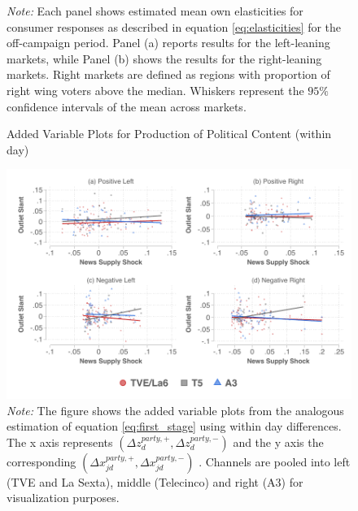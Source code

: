 \documentclass[12pt]{article}
\begin{document}
\begin{figure}[!htbp]
		\vspace{0.5em} %
		
		\captionsetup{justification=justified}
		\caption*{\textit{Note:} \small Each panel shows estimated mean own elasticities for consumer responses  as described in equation \ref{eq:elasticities} for the off-campaign period. Panel (a) reports results for the left-leaning markets, while Panel (b) shows the results for the right-leaning markets. Right markets are defined as regions with proportion of right wing voters above the median. Whiskers represent the $95\%$ confidence intervals of the mean across markets.}
	\end{figure}
	
	
	
	\begin{figure}[ht!]
		\centering
		\caption{Added Variable Plots for Production of Political Content (within day)}
		\includegraphics[width=160mm]{figures/fwl_plots_lowess_diff_costs_v2}
		\caption*{\small \textit{Note:} The figure shows the added variable plots from the analogous estimation of equation \ref{eq:first_stage} using within day differences. The x axis represents $\left(\Delta z_d^{party,+},\Delta z_d^{party,-}\right) $ and the y axis the corresponding  $\left(\Delta x_{jd}^{party,+},\Delta x_{jd}^{party,-}\right) $   . Channels are pooled into left (TVE and La Sexta), middle (Telecinco) and right (A3) for visualization purposes.  }
		\label{fig:fwl_diff}
	\end{figure}
	
\end{document}
